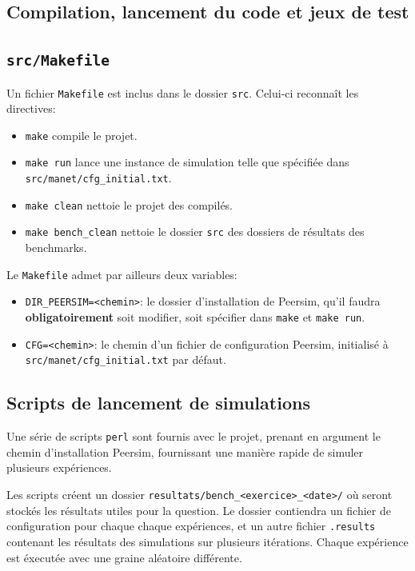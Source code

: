 \documentclass[a4paper]{article}
\begin{document}
\begin{appendix}
  \section{Compilation, lancement du code et jeux de test}
  \subsection{\texttt{src/Makefile}}
    Un fichier \texttt{Makefile} est inclus dans le dossier
    \texttt{src}. Celui-ci reconnaît les directives:
    \begin{itemize}
    \item \texttt{make} compile le projet.
    \item \texttt{make run} lance une instance de simulation telle que
      spécifiée dans \texttt{src/manet/cfg\_initial.txt}.
    \item \texttt{make clean} nettoie le projet des compilés.
    \item \texttt{make bench\_clean} nettoie le dossier \texttt{src}
      des dossiers de résultats des benchmarks.\\
    \end{itemize}

    Le \texttt{Makefile} admet par ailleurs deux variables:
    \begin{itemize}
    \item \texttt{DIR\_PEERSIM=<chemin>}: le dossier d'installation de
      Peersim, qu'il faudra \textbf{obligatoirement} soit modifier,
      soit spécifier dans \texttt{make} et \texttt{make run}.
    \item \texttt{CFG=<chemin>}: le chemin d'un fichier de
      configuration Peersim, initialisé à \texttt{src/manet/cfg\_initial.txt} par défaut.
    \end{itemize}

    \subsection{Scripts de lancement de simulations}
    Une série de scripts \texttt{perl} sont fournis avec le projet,
    prenant en argument le chemin d'installation Peersim, fournissant
    une manière rapide de simuler plusieurs expériences.

    Les scripts créent un dossier \texttt{resultats/bench\_<exercice>\_<date>/} où seront stockés les
    résultats utiles pour la question. Le dossier contiendra
    un fichier de configuration pour chaque chaque expériences, et un
    autre fichier \texttt{.results} contenant les résultats des
    simulations sur plusieurs itérations. Chaque expérience est éxecutée avec une graine aléatoire différente.



\end{appendix}
\end{document}
